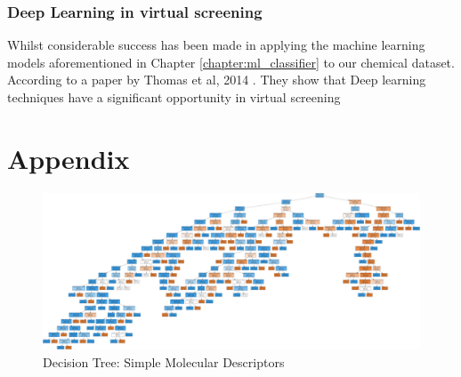 \documentclass[a4paper,12pt]{report}
\begin{document}
		\subsection{Deep Learning in virtual screening}
		Whilst considerable success has been made in applying the machine learning models aforementioned in Chapter \ref{chapter:ml_classifier} to our chemical dataset. According to a paper by Thomas et al, 2014 \cite{Thomasetal2014}. They show 
		that Deep learning techniques have a significant opportunity in virtual screening


\chapter*{Appendix}
\begin{figure}[H]
	\centering
	\includegraphics[width=\textwidth,scale=1,height=\textheight]{images/bbb_tree_smd}
	\caption{Decision Tree: Simple Molecular Descriptors}
	\label{fig:bbb_tree_smd_large}
\end{figure}




\end{document}
